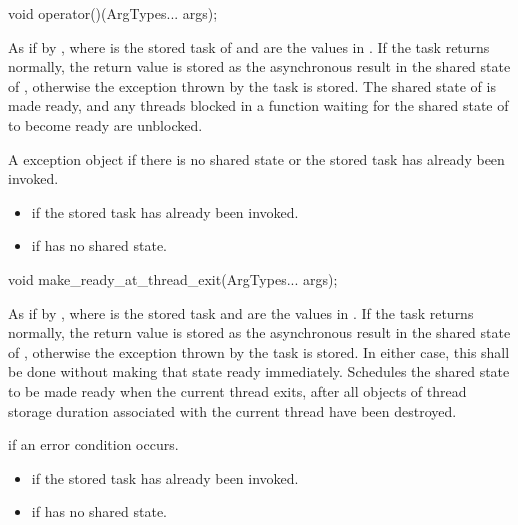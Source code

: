 %
\begin{itemdecl}
void operator()(ArgTypes... args);
\end{itemdecl}

\begin{itemdescr}
\pnum
\effects As if by ,
where  is the
stored task of  and
 are the values in . If the task returns normally,
the return value is stored as the asynchronous result in the shared state of
, otherwise the exception thrown by the task is stored. The
shared state of  is made ready, and any threads blocked in a
function waiting for
the shared state of  to become ready are unblocked.

\pnum
\throws A  exception object if there is no shared
state or the stored task has already been invoked.

\pnum
\errors
\begin{itemize}
\item {} if
the stored task has already been invoked.
\item {} if  has no shared state.
\end{itemize}
\end{itemdescr}

%
\begin{itemdecl}
void make_ready_at_thread_exit(ArgTypes... args);
\end{itemdecl}

\begin{itemdescr}
\pnum
\effects As if by ,
where  is the stored task and
 are the values in . If the task returns normally,
the return value is stored as the asynchronous result in the shared state of
, otherwise the exception thrown by the task is stored. In either
case, this shall be done without making that state ready immediately. Schedules
the shared state to be made ready when the current thread exits,
after all objects of thread storage duration associated with the current thread
have been destroyed.

\pnum
\throws {} if an error condition occurs.

\pnum
\errors
\begin{itemize}
\item {} if the
stored task has already been invoked.
\item {} if  has no shared state.
\end{itemize}
\end{itemdescr}

